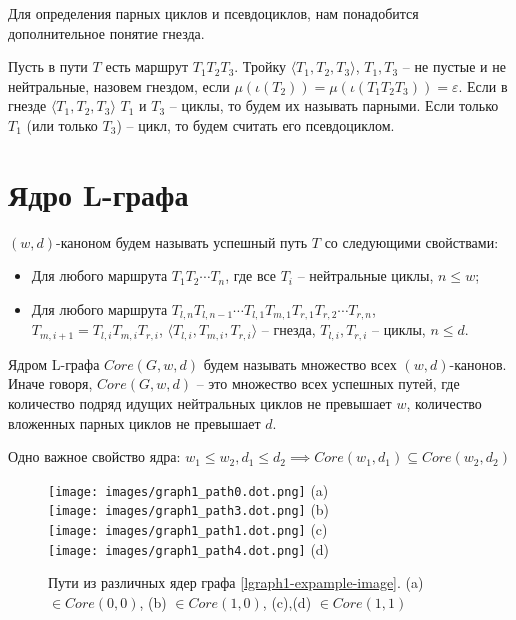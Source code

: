 Для определения парных циклов и псевдоциклов, нам понадобится дополнительное понятие гнезда.

Пусть в пути $T$ есть маршрут $T_1 T_2 T_3$. 
Тройку $\langle T_1, T_2, T_3 \rangle$, $T_1, T_3$ -- не пустые и не нейтральные, назовем гнездом, 
если $\mu(\iota(T_2)) = \mu(\iota(T_1 T_2 T_3)) = \varepsilon$.
Если в гнезде $\langle T_1, T_2, T_3 \rangle$ $T_1$ и $T_3$ -- циклы, то будем их называть парными.
Если только $T_1$ (или только $T_3$) -- цикл, то будем считать его псевдоциклом.

\section{Ядро L-графа}

$(w,d)$-каноном будем называть успешный путь $T$ со следующими свойствами:
\begin{itemize}
    \item Для любого маршрута $T_1 T_2 \cdots T_n$, где все $T_i$ -- нейтральные циклы, $n \leq w$;
    \item Для любого маршрута $T_{l,n} T_{l,n-1} \cdots T_{l,1} T_{m,1} T_{r,1} T_{r,2} \cdots T_{r,n}$,\\
       $T_{m,i+1} = T_{l,i} T_{m,i} T_{r,i}$, $\langle T_{l,i}, T_{m,i}, T_{r,i} \rangle$ -- гнезда, $T_{l,i}, T_{r,i}$ -- циклы,
       $n \leq d$.
\end{itemize}

Ядром L-графа $Core(G, w, d)$ будем называть множество всех $(w,d)$-канонов. 
Иначе говоря, $Core(G, w, d)$ -- это множество всех успешных путей, 
где количество подряд идущих нейтральных циклов не превышает  $w$, 
количество вложенных парных циклов не превышает $d$.  

Одно важное свойство ядра: $w_1 \leq w_2, d_1 \leq d_2 \implies Core(w_1, d_1) \subseteq Core(w_2, d_2)$

\begin{figure}[t]
    \centering
    \texttt{[image: images/graph1\_path0.dot.png]} (a)\\
    \texttt{[image: images/graph1\_path3.dot.png]} (b)\\
    \texttt{[image: images/graph1\_path1.dot.png]} (c)\\
    \texttt{[image: images/graph1\_path4.dot.png]} (d)\\
    
    \caption{Пути из различных ядер графа \ref{lgraph1-expample-image}. (a) $\in Core(0,0)$, (b) $\in Core(1,0)$, (c),(d) $\in Core(1,1)$}
    \label{lgraph1-core-example}
\end{figure}


\clearpage